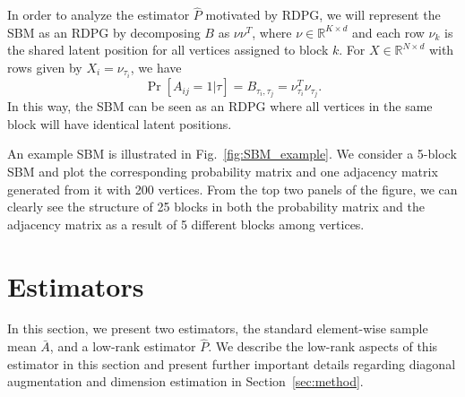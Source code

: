 \documentclass[10pt,letterpaper]{article}
\renewcommand{\Re}{\mathbb{R}}
\renewcommand{\hat}{\widehat}
\begin{document}
In order to analyze the estimator $\hat{P}$ motivated by RDPG, we will represent the SBM as an RDPG by
decomposing $B$ as $\nu \nu^T$, where $\nu \in \Re^{K \times d}$ and each row $\nu_k$ is the shared latent position for all vertices assigned to block $k$. 
For $X \in \Re^{N \times d}$ with rows given by $X_i = \nu_{\tau_i}$, we have
\[
    \Pr[A_{ij} = 1|\tau] = B_{\tau_i, \tau_j} = \nu_{\tau_i}^T \nu_{\tau_j}.
\]
In this way, the SBM can be seen as an RDPG where all vertices in the same block will have identical latent positions.

An example SBM is illustrated in Fig.~\ref{fig:SBM_example}.
We consider a 5-block SBM and plot the corresponding probability matrix and one adjacency matrix generated from it with 200 vertices. From the top two panels of the figure, we can clearly see the structure of 25 blocks in both the probability matrix and the adjacency matrix as a result of 5 different blocks among vertices.



\section{Estimators}
\label{sec:estimator}

In this section, we present two estimators, the standard element-wise sample mean $\bar{A}$, and a low-rank estimator $\hat{P}$.
We describe the low-rank aspects of this estimator in this section and present further important details regarding diagonal augmentation and dimension estimation in Section~\ref{sec:method}.
\end{document}
